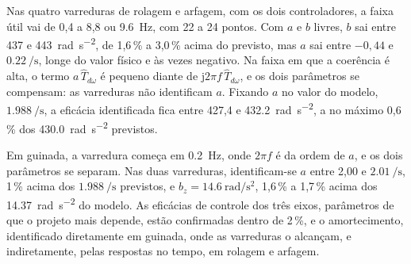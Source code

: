 Nas quatro varreduras de rolagem e arfagem, com os dois controladores, a
faixa útil vai de 0,4 a 8,8 ou \SI{9.6}{\hertz}, com 22 a 24 pontos. Com
$a$ e $b$ livres, $b$ sai entre 437 e \SI{443}{\radian\per\second\squared},
de 1,6\,\% a 3,0\,\% acima do previsto, mas $a$ sai entre $-0{,}44$ e
$\SI{0.22}{\per\second}$, longe do valor físico e às vezes negativo. Na faixa em que a coerência
é alta, o termo $a\,\hat T_{d\omega}$ é pequeno diante de
$\mathrm{j}2\pi f\,\hat T_{d\omega}$, e os dois parâmetros se compensam: as
varreduras não identificam $a$. Fixando $a$ no valor do modelo,
$\SI{1.988}{\per\second}$, a eficácia identificada fica entre 427,4 e
\SI{432.2}{\radian\per\second\squared}, a no máximo 0,6\,\% dos
\SI{430.0}{\radian\per\second\squared} previstos.

Em guinada, a varredura começa em \SI{0.2}{\hertz}, onde $2\pi f$ é da
ordem de $a$, e os dois parâmetros se separam. Nas duas varreduras,
identificam-se $a$ entre 2,00 e $\SI{2.01}{\per\second}$, 1\,\% acima
dos $\SI{1.988}{\per\second}$ previstos, e
$b_z = \SI{14.6}{\radian\per\second\squared}$, 1,6\,\% a 1,7\,\% acima
dos \SI{14.37}{\radian\per\second\squared} do modelo. As eficácias de
controle dos três eixos, parâmetros de que o projeto mais depende, estão
confirmadas dentro de 2\,\%, e o amortecimento, identificado diretamente em
guinada, onde as varreduras o alcançam, e indiretamente, pelas respostas no
tempo, em rolagem e arfagem.
